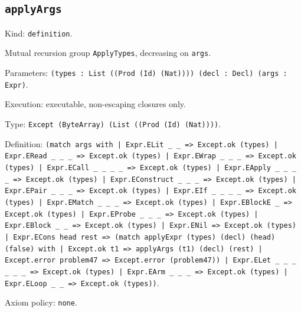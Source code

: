 \documentclass[11pt]{article}
\begin{document}
\subsection*{\texttt{applyArgs}}
\noindent Kind: \texttt{definition}.\par
\noindent Mutual recursion group \texttt{ApplyTypes}, decreasing on \texttt{args}.\par
\noindent Parameters: \texttt{(types : List ((Prod (Id) (Nat)))) (decl : Decl) (args : Expr)}.\par
\noindent Execution: executable, non-escaping closures only.\par
\noindent Type: \texttt{Except (ByteArray) (List ((Prod (Id) (Nat))))}.\par
\noindent Definition: \texttt{(match args with | Expr.ELit \_ \_ => Except.ok (types) | Expr.ERead \_ \_ \_ => Except.ok (types) | Expr.EWrap \_ \_ \_ => Except.ok (types) | Expr.ECall \_ \_ \_ \_ => Except.ok (types) | Expr.EApply \_ \_ \_ \_ => Except.ok (types) | Expr.EConstruct \_ \_ \_ => Except.ok (types) | Expr.EPair \_ \_ \_ => Except.ok (types) | Expr.EIf \_ \_ \_ \_ => Except.ok (types) | Expr.EMatch \_ \_ \_ => Except.ok (types) | Expr.EBlockE \_ => Except.ok (types) | Expr.EProbe \_ \_ \_ => Except.ok (types) | Expr.EBlock \_ \_ => Except.ok (types) | Expr.ENil => Except.ok (types) | Expr.ECons head rest => (match applyExpr (types) (decl) (head) (false) with | Except.ok t1 => applyArgs (t1) (decl) (rest) | Except.error problem47 => Except.error (problem47)) | Expr.ELet \_ \_ \_ \_ \_ \_ => Except.ok (types) | Expr.EArm \_ \_ \_ => Except.ok (types) | Expr.ELoop \_ \_ => Except.ok (types))}.\par
\noindent Axiom policy: \texttt{none}.\par
\end{document}

